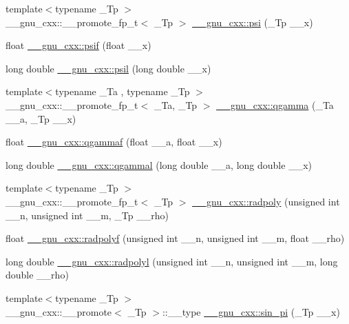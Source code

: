 \begin{DoxyCompactItemize}
\item 
{\footnotesize template$<$typename \+\_\+\+Tp $>$ }\\\+\_\+\+\_\+gnu\+\_\+cxx\+::\+\_\+\+\_\+promote\+\_\+fp\+\_\+t$<$ \+\_\+\+Tp $>$ \hyperlink{group__gnu__math__spec__func_gaae7574990cdbb6a637d39c2c036928c0}{\+\_\+\+\_\+gnu\+\_\+cxx\+::psi} (\+\_\+\+Tp \+\_\+\+\_\+x)
\item 
float \hyperlink{group__gnu__math__spec__func_ga47ae74abfaa3f549eed4a87b1b63449d}{\+\_\+\+\_\+gnu\+\_\+cxx\+::psif} (float \+\_\+\+\_\+x)
\item 
long double \hyperlink{group__gnu__math__spec__func_gaaf230aedcb20a1c5a43fc71132bb0dc1}{\+\_\+\+\_\+gnu\+\_\+cxx\+::psil} (long double \+\_\+\+\_\+x)
\item 
{\footnotesize template$<$typename \+\_\+\+Ta , typename \+\_\+\+Tp $>$ }\\\+\_\+\+\_\+gnu\+\_\+cxx\+::\+\_\+\+\_\+promote\+\_\+fp\+\_\+t$<$ \+\_\+\+Ta, \+\_\+\+Tp $>$ \hyperlink{group__gnu__math__spec__func_ga3ef7aeaa55f9e7b02f02d1d605a716a6}{\+\_\+\+\_\+gnu\+\_\+cxx\+::qgamma} (\+\_\+\+Ta \+\_\+\+\_\+a, \+\_\+\+Tp \+\_\+\+\_\+x)
\item 
float \hyperlink{group__gnu__math__spec__func_ga6749b7a7d3b403e79ca4cf676719dd72}{\+\_\+\+\_\+gnu\+\_\+cxx\+::qgammaf} (float \+\_\+\+\_\+a, float \+\_\+\+\_\+x)
\item 
long double \hyperlink{group__gnu__math__spec__func_ga8062654272cc446bb9a36f62d9fc5ab0}{\+\_\+\+\_\+gnu\+\_\+cxx\+::qgammal} (long double \+\_\+\+\_\+a, long double \+\_\+\+\_\+x)
\item 
{\footnotesize template$<$typename \+\_\+\+Tp $>$ }\\\+\_\+\+\_\+gnu\+\_\+cxx\+::\+\_\+\+\_\+promote\+\_\+fp\+\_\+t$<$ \+\_\+\+Tp $>$ \hyperlink{group__gnu__math__spec__func_gac44ad9bda660a21a6b297d313f0ecf48}{\+\_\+\+\_\+gnu\+\_\+cxx\+::radpoly} (unsigned int \+\_\+\+\_\+n, unsigned int \+\_\+\+\_\+m, \+\_\+\+Tp \+\_\+\+\_\+rho)
\item 
float \hyperlink{group__gnu__math__spec__func_ga8a98d7c7c14f1aadff90123a114fa2c9}{\+\_\+\+\_\+gnu\+\_\+cxx\+::radpolyf} (unsigned int \+\_\+\+\_\+n, unsigned int \+\_\+\+\_\+m, float \+\_\+\+\_\+rho)
\item 
long double \hyperlink{group__gnu__math__spec__func_ga377febebd1096400897170bb7a76cd3a}{\+\_\+\+\_\+gnu\+\_\+cxx\+::radpolyl} (unsigned int \+\_\+\+\_\+n, unsigned int \+\_\+\+\_\+m, long double \+\_\+\+\_\+rho)
\item 
{\footnotesize template$<$typename \+\_\+\+Tp $>$ }\\\+\_\+\+\_\+gnu\+\_\+cxx\+::\+\_\+\+\_\+promote$<$ \+\_\+\+Tp $>$\+::\+\_\+\+\_\+type \hyperlink{group__gnu__math__spec__func_gacd465f58d1ff0dbf15cf8d44c0729ba6}{\+\_\+\+\_\+gnu\+\_\+cxx\+::sin\+\_\+pi} (\+\_\+\+Tp \+\_\+\+\_\+x)

\end{DoxyCompactItemize}
